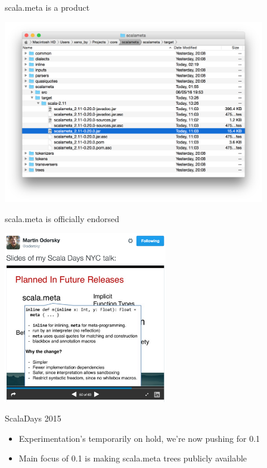 \documentclass[svgnames,dvipsnames,hyperref={bookmarks=false},usepdftitle=false]{beamer}
\begin{document}
\begin{frame}{scala.meta is a product}
\vskip20pt
\begin{center}
\includegraphics[height=8cm]{is-a-product.png}
\end{center}
\end{frame}

\begin{frame}{scala.meta is officially endorsed}
\vskip20pt
\begin{center}
\includegraphics[height=7.5cm]{is-officially-endorsed.png}
\end{center}
\end{frame}


\begin{frame}{ScalaDays 2015}
\begin{itemize}
\item Experimentation's temporarily on hold, we’re now pushing for 0.1
\item Main focus of 0.1 is making scala.meta trees publicly available
\end{itemize}
\end{frame}
\end{document}
